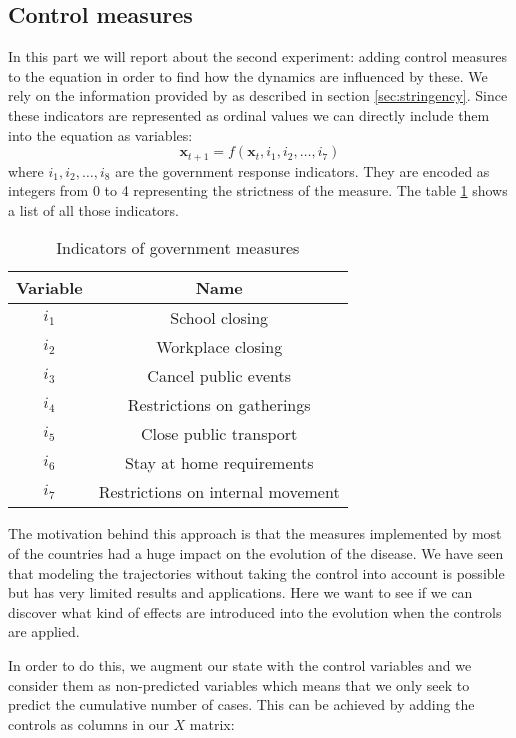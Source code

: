 \documentclass[12pt, letterpaper]{article}
\begin{document}
\subsection{Control measures}

In this part we will report about the second experiment: adding control measures to the equation in order to find how the dynamics are influenced by these. 
We rely on the information provided by \cite{} as described in section \ref{sec:stringency}.
Since these indicators are represented as ordinal values we can directly include them into the equation as variables: 
$$\mathbf{x}_{t+1} = f(\mathbf{x}_t, i_1, i_2, \dots, i_7)$$
where $i_1, i_2, \dots, i_8$ are the government response indicators. 
They are encoded as integers from 0 to 4 representing the strictness of the measure. The table \ref{tab:stringency} shows a list of all those indicators.


\begin{table}[h!]
\centering
\begin{tabular}{ |c|c| } 
 \hline
 Variable & Name \\ 
 \hline
$i_1$ & School closing \\
$i_2$ & Workplace closing \\
$i_3$ & Cancel public events \\
$i_4$ & Restrictions on gatherings \\
$i_5$ & Close public transport \\ 
$i_6$ & Stay at home requirements \\ 
$i_7$ & Restrictions on internal movement \\

 \hline
\end{tabular}
\caption{Indicators of government measures}
\label{tab:stringency}
\end{table}

The motivation behind this approach is that the measures implemented by most of the countries had a huge impact on the evolution of the disease. 
We have seen that modeling the trajectories without taking the control into account is possible but has very limited results and applications.
Here we want to see if we can discover what kind of effects are introduced into the evolution when the controls are applied.

In order to do this, we augment our state with the control variables and we consider them as non-predicted variables which means that we only seek to predict the cumulative number of cases. 
This can be achieved by adding the controls as columns in our $X$ matrix:
\end{document}
